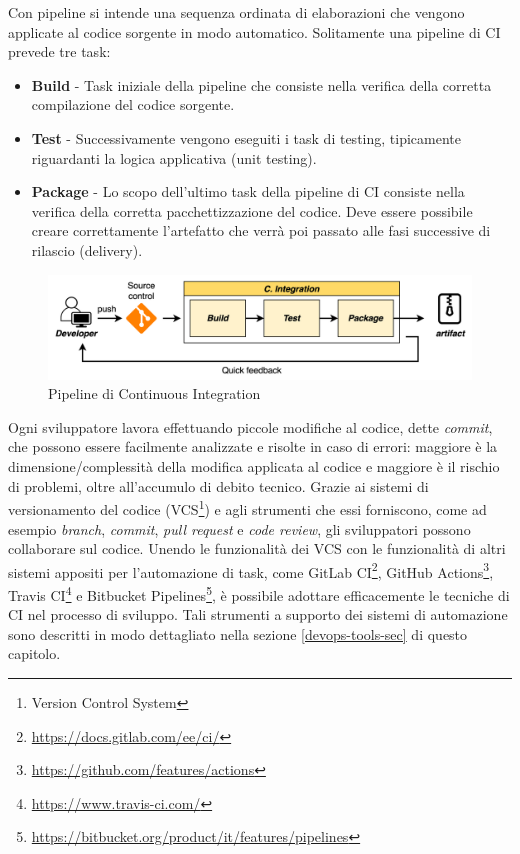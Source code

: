 Con pipeline si intende una sequenza ordinata di elaborazioni che vengono applicate al codice sorgente in modo automatico. Solitamente una pipeline di CI prevede tre task:

\begin{itemize}
    \item \textbf{Build} - Task iniziale della pipeline che consiste nella verifica della corretta compilazione del codice sorgente.
    
    \item \textbf{Test} - Successivamente vengono eseguiti i task di testing, tipicamente riguardanti la logica applicativa (unit testing).
    
    \item \textbf{Package} - Lo scopo dell'ultimo task della pipeline di CI consiste nella verifica della corretta pacchettizzazione del codice. Deve essere possibile creare correttamente l'artefatto che verrà poi passato alle fasi successive di rilascio (delivery).
\end{itemize}

\begin{figure}[H]
    \centering
    \includegraphics[width=1\textwidth]{img/ci-pipeline.png}
    \caption{Pipeline di Continuous Integration}
    \label{ci-pipeline}
\end{figure}

Ogni sviluppatore lavora effettuando piccole modifiche al codice, 
dette \textit{commit}, 
che possono essere facilmente analizzate e risolte in caso di errori: 
maggiore è la dimensione/complessità della modifica applicata al codice e maggiore è il rischio di problemi,
oltre all'accumulo di debito tecnico. 
Grazie ai sistemi di versionamento del codice (VCS\footnote{Version Control System}) e agli strumenti che essi forniscono,
come ad esempio \textit{branch},
\textit{commit},
\textit{pull request} e \textit{code review},
gli sviluppatori possono collaborare sul codice.
Unendo le funzionalità dei VCS con le funzionalità di altri sistemi appositi per l'automazione di task,
come GitLab CI\footnote{\href{https://docs.gitlab.com/ee/ci/}{https://docs.gitlab.com/ee/ci/}}, 
GitHub Actions\footnote{\href{https://github.com/features/actions}{https://github.com/features/actions}},
Travis CI\footnote{\href{https://www.travis-ci.com/}{https://www.travis-ci.com/}} e Bitbucket Pipelines\footnote{\href{https://bitbucket.org/product/it/features/pipelines}{https://bitbucket.org/product/it/features/pipelines}}, 
è possibile adottare efficacemente le tecniche di CI nel processo di sviluppo. 
Tali strumenti a supporto dei sistemi di automazione sono descritti in modo dettagliato nella sezione \ref{devops-tools-sec} di questo capitolo.

